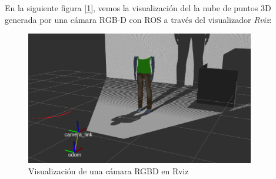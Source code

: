 En la siguiente figura [\ref{fig:camara_rviz}], vemos la visualización del la nube de puntos 3D generada por una cámara RGB-D con ROS a través del visualizador \textit{Rviz}:\\

\begin{figure} [H]
  \begin{center}
    \includegraphics[width=10cm]{imagenes/cap3/camara-rviz.png}
  \end{center}
  \caption[Visualización de una cámara RGBD en Rviz]{Visualización de una cámara RGBD en Rviz}
  \label{fig:camara_rviz}
\end{figure}\


